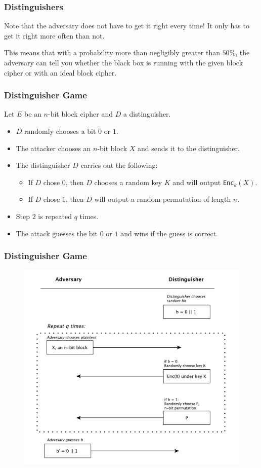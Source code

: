 \documentclass{beamer}
\newcommand{\<}{\langle}
\renewcommand{\>}{\rangle}
\begin{document}
\begin{frame}
\frametitle{Distinguishers}

Note that the adversary does not have to get it right every time! It only has to get it right more often than not. \newline

This means that with a probability more than negligibly greater than $50\%$, the adversary can tell you whether the black box is running with the given block cipher or with an ideal block cipher. 
\end{frame}


\begin{frame}[fragile]
\frametitle{Distinguisher Game}

Let $E$ be an $n$-bit block cipher and $D$ a distinguisher.
\begin{itemize}
\item $D$ randomly chooses a bit $0$ or $1$.
\item  The attacker chooses an $n$-bit block $X$ and sends it to the distinguisher.
\item  The distinguisher $D$ carries out the following:
	\begin{itemize}
	\item If $D$ chose $0$, then $D$ chooses a random key $K$ and will output \verb|Enc|$_k(X)$.
	\item If $D$ chose $1$, then $D$ will output a random permutation of length $n$.
	\end{itemize}
\item Step $2$ is repeated $q$ times.
\item The attack guesses the bit $0$ or $1$ and wins if the guess is correct. 
\end{itemize}
\end{frame}


\begin{frame}
\frametitle{Distinguisher Game}

\begin{figure}
\includegraphics[scale=.4]{IMG/distinguisher}
\end{figure}
\end{frame}
\end{document}
